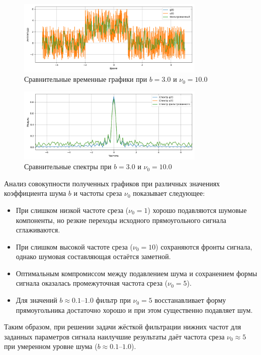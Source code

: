 \documentclass[a4paper]{article}
\begin{document}
\begin{figure}[H]
    \centering
    \includegraphics[width=0.8\textwidth]{src/lpf/time_3.0_10.0.png}
    \caption{Сравнительные временные графики при $b=3.0$ и $\nu_0=10.0$}
\end{figure}
\begin{figure}[H]
    \centering
    \includegraphics[width=0.8\textwidth]{src/lpf/spec_3.0_10.0.png}
    \caption{Сравнительные спектры при $b=3.0$ и $\nu_0=10.0$}
\end{figure}
\noindent           
Анализ совокупности полученных графиков при различных значениях коэффициента шума $b$ и частоты среза $\nu_0$ показывает следующее:
\begin{itemize}
    \item При слишком низкой частоте среза ($\nu_0=1$) хорошо подавляются шумовые компоненты, но резкие переходы исходного прямоугольного сигнала сглаживаются.
    \item При слишком высокой частоте среза ($\nu_0=10$) сохраняются фронты сигнала, однако шумовая составляющая остаётся заметной.
    \item Оптимальным компромиссом между подавлением шума и сохранением формы сигнала оказалась промежуточная частота среза ($\nu_0=5$). 
    \item Для значений $b \approx 0.1\text{--}1.0$ фильтр при $\nu_0=5$ восстанавливает форму прямоугольника достаточно хорошо и при этом существенно подавляет шум.
\end{itemize}
Таким образом, при решении задачи жёсткой фильтрации нижних частот для заданных параметров сигнала наилучшие результаты даёт частота среза $\nu_0 \approx 5$ при умеренном уровне шума ($b \approx 0.1\text{--}1.0$).
\end{document}
